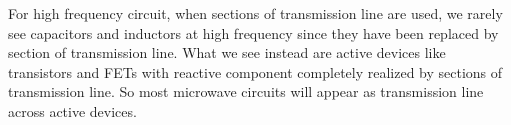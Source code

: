   For high frequency circuit, when sections of transmission line are used, we rarely see capacitors and inductors at high frequency since they have been replaced by section of transmission line. What we see instead are active devices like transistors and FETs with reactive component completely realized by sections of transmission line. So most microwave circuits will appear as transmission line  across active devices.   